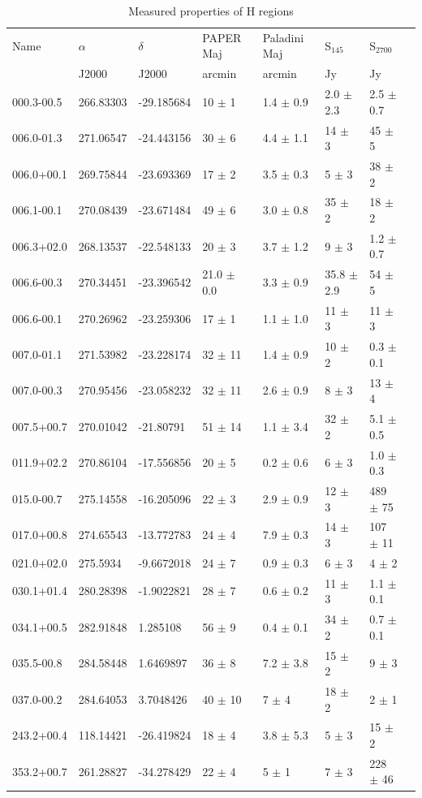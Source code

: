 \documentclass[useAMS,usenatbib]{mn2e}
\begin{document}
\begin{table}
\caption{Measured properties of {H} regions}
\begin{tabular}{llllllll}
\hline
Name &  $\alpha$   &  $\delta$  &  PAPER Maj   &  Paladini Maj &  S$_{145}$  &  S$_{2700}$\\
 & J2000  &  J2000  &  arcmin  &  arcmin  &  Jy  &  Jy\\
\hline
000.3-00.5 & 266.83303 & -29.185684 & 10 $\pm$ 1 & 1.4 $\pm$ 0.9 & {\color{red}2.0 $\pm$ 2.3} & 2.5 $\pm$ 0.7 \\
006.0-01.3 & 271.06547 & -24.443156 & 30 $\pm$ 6 & 4.4 $\pm$ 1.1 & 14 $\pm$ 3 & 45 $\pm$ 5 \\
006.0+00.1 & 269.75844 & -23.693369 & 17 $\pm$ 2 & 3.5 $\pm$ 0.3 & 5 $\pm$ 3 & 38 $\pm$ 2 \\
006.1-00.1 & 270.08439 & -23.671484 & 49 $\pm$ 6 & 3.0 $\pm$ 0.8 & 35 $\pm$ 2 & 18 $\pm$ 2 \\

006.3+02.0 & 268.13537 & -22.548133 & 20 $\pm$ 3 & 3.7 $\pm$ 1.2 & 9 $\pm$ 3 & 1.2 $\pm$ 0.7 \\
006.6-00.3 & 270.34451 & -23.396542 & {\color{red}21.0 $\pm$ 0.0} & 3.3 $\pm$ 0.9 & 35.8 $\pm$ 2.9 & 54 $\pm$ 5 \\
006.6-00.1 & 270.26962 & -23.259306 & 17 $\pm$ 1 & 1.1 $\pm$ 1.0 & 11 $\pm$ 3 & 11 $\pm$ 3 \\
007.0-01.1 & 271.53982 & -23.228174 & 32 $\pm$ 11 & 1.4 $\pm$ 0.9 & 10 $\pm$ 2 & 0.3 $\pm$ 0.1 \\
007.0-00.3 & 270.95456 & -23.058232 & 32 $\pm$ 11 & 2.6 $\pm$ 0.9 & 8 $\pm$ 3 & 13 $\pm$ 4 \\
007.5+00.7 & 270.01042 & -21.80791 & 51 $\pm$ 14 & {\color{red}1.1 $\pm$ 3.4} & 32 $\pm$ 2 & 5.1 $\pm$ 0.5 \\
011.9+02.2 & 270.86104 & -17.556856 & 20 $\pm$ 5 & {\color{red}0.2 $\pm$ 0.6} & 6 $\pm$ 3 & 1.0 $\pm$ 0.3 \\
015.0-00.7 & 275.14558 & -16.205096 & 22 $\pm$ 3 & 2.9 $\pm$ 0.9 & 12 $\pm$ 3 & 489 $\pm$ 75 \\
017.0+00.8 & 274.65543 & -13.772783 & 24 $\pm$ 4 & 7.9 $\pm$ 0.3 & 14 $\pm$ 3 & 107 $\pm$ 11 \\
021.0+02.0 & 275.5934 & -9.6672018 & 24 $\pm$ 7 & 0.9 $\pm$ 0.3 & 6 $\pm$ 3 & 4 $\pm$ 2 \\
030.1+01.4 & 280.28398 & -1.9022821 & 28 $\pm$ 7 & 0.6 $\pm$ 0.2 & 11 $\pm$ 3 & 1.1 $\pm$ 0.1 \\
034.1+00.5 & 282.91848 & 1.285108 & 56 $\pm$ 9 & 0.4 $\pm$ 0.1 & 34 $\pm$ 2 & 0.7 $\pm$ 0.1 \\
035.5-00.8 & 284.58448 & 1.6469897 & 36 $\pm$ 8 & 7.2 $\pm$ 3.8 & 15 $\pm$ 2 & 9 $\pm$ 3 \\
037.0-00.2 & 284.64053 & 3.7048426 & 40 $\pm$ 10 & 7 $\pm$ 4 & 18 $\pm$ 2 & 2 $\pm$ 1 \\
243.2+00.4 & 118.14421 & -26.419824 & 18 $\pm$ 4 & {\color{red}3.8 $\pm$ 5.3} & 5 $\pm$ 3 & 15 $\pm$ 2 \\
353.2+00.7 & 261.28827 & -34.278429 & 22 $\pm$ 4 & 5 $\pm$ 1 & 7 $\pm$ 3 & 228 $\pm$ 46 \\
\hline
\end{tabular}
\label{tab:hii}
\end{table}
\end{document}
